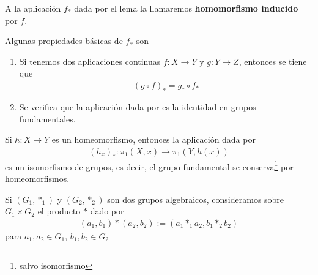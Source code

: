 \begin{definicion}
    A la aplicación $f_*$ dada por el lema la llamaremos \textbf{homomorfismo inducido} por $f$.
\end{definicion}

\begin{propiedades}
    Algunas propiedades básicas de $f_*$ son
    \begin{enumerate}
        \item Si tenemos dos aplicaciones continuas $f:X\to Y$ y $g:Y \to Z$, entonces se tiene que 
        \begin{gather*}
            (g\circ f)_* = g_* \circ f_*
        \end{gather*}

        \item  Se verifica que la aplicación dada por
        es la identidad en grupos fundamentales.
    \end{enumerate}
\end{propiedades}

\begin{coro}
    Si $h:X\to Y$ es un homeomorfismo, entonces la aplicación dada por
    \begin{gather*}
        (h_x)_*:\pi_1(X,x) \to \pi_1(Y,h(x))
    \end{gather*}
    es un isomorfismo de grupos, es decir, el grupo fundamental se conserva\footnote{salvo isomorfismo} por homeomorfismos.
\end{coro}

\begin{definicion}
    Si $(G_1,\ast_1)$ y $(G_2, \ast_2)$ son dos grupos algebraicos, consideramos sobre $G_1\times G_2$ el producto $\ast$ dado por 
    \begin{gather*}
        (a_1,b_1)\ast(a_2,b_2) := (a_1\ast_1 a_2, b_1 \ast_2 b_2)
    \end{gather*}
    para $a_1,a_2\in G_1$, $b_1,b_2\in G_2$
\end{definicion}

